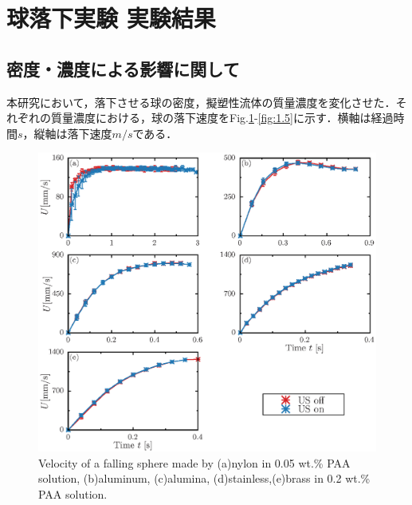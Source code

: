 \section{球落下実験 実験結果}
\label{sec:expData}

\subsection{密度・濃度による影響に関して}
本研究において，落下させる球の密度，擬塑性流体の質量濃度を変化させた．それぞれの質量濃度における，球の落下速度をFig.\ref{fig:0.05-0.2}-\ref{fig:1.5}に示す．横軸は経過時間$s$，縦軸は落下速度$m/s$である．

\begin{figure}[H]
    \centering
    \includegraphics[width=1.0\textwidth]{5-Results/0.05-0.2.eps}
    \caption{Velocity of a falling sphere made by (a)nylon in 0.05 wt.\% PAA solution, (b)aluminum, (c)alumina, (d)stainless,(e)brass in 0.2 wt.\% PAA solution.}
    \label{fig:0.05-0.2}
\end{figure}

